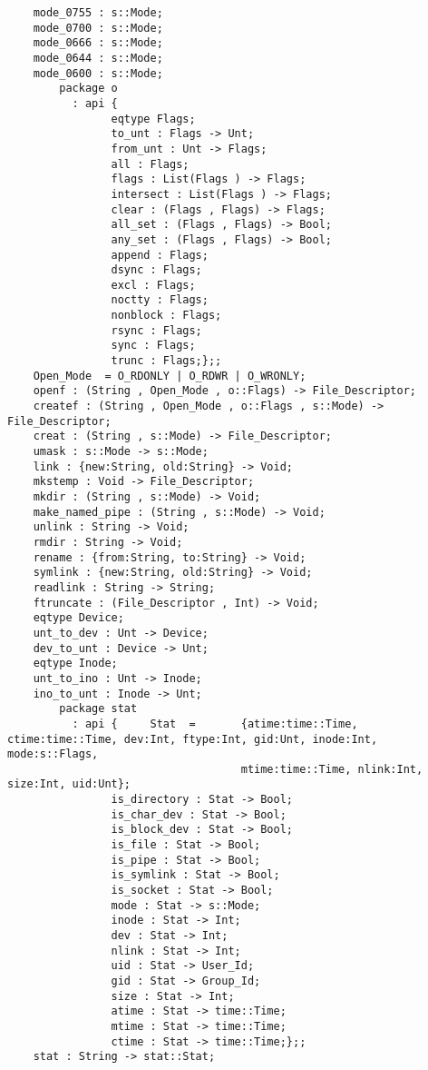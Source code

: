 \begin{verbatim}
    mode_0755 : s::Mode;
    mode_0700 : s::Mode;
    mode_0666 : s::Mode;
    mode_0644 : s::Mode;
    mode_0600 : s::Mode;
        package o
          : api {
                eqtype Flags;
                to_unt : Flags -> Unt;
                from_unt : Unt -> Flags;
                all : Flags;
                flags : List(Flags ) -> Flags;
                intersect : List(Flags ) -> Flags;
                clear : (Flags , Flags) -> Flags;
                all_set : (Flags , Flags) -> Bool;
                any_set : (Flags , Flags) -> Bool;
                append : Flags;
                dsync : Flags;
                excl : Flags;
                noctty : Flags;
                nonblock : Flags;
                rsync : Flags;
                sync : Flags;
                trunc : Flags;};;
    Open_Mode  = O_RDONLY | O_RDWR | O_WRONLY;
    openf : (String , Open_Mode , o::Flags) -> File_Descriptor;
    createf : (String , Open_Mode , o::Flags , s::Mode) -> File_Descriptor;
    creat : (String , s::Mode) -> File_Descriptor;
    umask : s::Mode -> s::Mode;
    link : {new:String, old:String} -> Void;
    mkstemp : Void -> File_Descriptor;
    mkdir : (String , s::Mode) -> Void;
    make_named_pipe : (String , s::Mode) -> Void;
    unlink : String -> Void;
    rmdir : String -> Void;
    rename : {from:String, to:String} -> Void;
    symlink : {new:String, old:String} -> Void;
    readlink : String -> String;
    ftruncate : (File_Descriptor , Int) -> Void;
    eqtype Device;
    unt_to_dev : Unt -> Device;
    dev_to_unt : Device -> Unt;
    eqtype Inode;
    unt_to_ino : Unt -> Inode;
    ino_to_unt : Inode -> Unt;
        package stat
          : api {     Stat  =       {atime:time::Time, ctime:time::Time, dev:Int, ftype:Int, gid:Unt, inode:Int, mode:s::Flags,
                                    mtime:time::Time, nlink:Int, size:Int, uid:Unt};
                is_directory : Stat -> Bool;
                is_char_dev : Stat -> Bool;
                is_block_dev : Stat -> Bool;
                is_file : Stat -> Bool;
                is_pipe : Stat -> Bool;
                is_symlink : Stat -> Bool;
                is_socket : Stat -> Bool;
                mode : Stat -> s::Mode;
                inode : Stat -> Int;
                dev : Stat -> Int;
                nlink : Stat -> Int;
                uid : Stat -> User_Id;
                gid : Stat -> Group_Id;
                size : Stat -> Int;
                atime : Stat -> time::Time;
                mtime : Stat -> time::Time;
                ctime : Stat -> time::Time;};;
    stat : String -> stat::Stat;

\end{verbatim}
